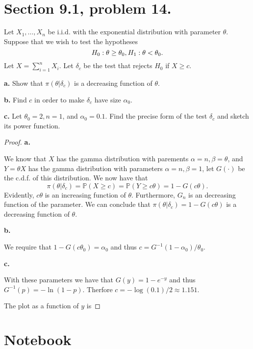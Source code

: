 \documentclass{article}
\renewcommand{\P}[1]{\mathbb{P}\left(#1\right)}
\newcommand{\randsamp}{X_1,\dots,X_n}
\newcommand{\cdf}{c.d.f. }
\newenvironment{hwproof}[1]
{
    #1
    \begin{proof}
}{
    \end{proof}
}
\begin{document}
\section{Section 9.1, problem 14.}
\begin{hwproof}
    {
        Let $\randsamp$ be i.i.d. with the exponential distribution with
        parameter $\theta$. Suppose that we wish to test the hypotheses
        \begin{equation*}
            H_0: \theta \geq \theta_0,\\
            H_1: \theta < \theta_0.
        \end{equation*}
        Let $X = \sum_{i = 1}^n X_i$. Let $\delta_c$ be the test that rejects
        $H_0$ if $X \geq c$.

        \textbf{a.} Show that $\pi(\theta | \delta_c)$ is a decreasing function of
        $\theta$.

        \textbf{b.} Find $c$ in order to make $\delta_c$ have size $\alpha_0$.

        \textbf{c.} Let $\theta_0 = 2, n = 1$, and $\alpha_0 = 0.1$. Find the
        precise form of the test $\delta_c$ and sketch its power function.

    }
    \textbf{a.}

    We know that $X$ has the gamma distribution with parements
    $\alpha = n, \beta = \theta$, and $Y = \theta X$ has the gamma distribution
    with parameters $\alpha = n, \beta = 1$, let $G(\cdot)$ be the \cdf of this
    distribution. We now have that
    \begin{equation*}
        \pi(\theta | \delta_c) = \P{X \geq c} = \P{Y \geq c\theta} = 1 - G(c\theta).
    \end{equation*}
    Evidently, $c\theta$ is an increasing function of $\theta$. Furthermore,
    $G_n$ is an decreasing function of the parameter. We can conclude that
    $\pi(\theta | \delta_c) = 1 - G(c\theta)$ is a decreasing function
    of $\theta$.

    \textbf{b.}

    We require that $1 - G(c\theta_0) = \alpha_0$ and thus
    $c = G^{-1}(1 - \alpha_0)/\theta_0$.

    \textbf{c.}

    With these parameters we have that $G(y) = 1 - e^{-y}$ and thus
    $G^{-1}(p) = -\ln(1 - p)$. Therfore
    $c = -\log(0.1)/2 \approx 1.151$.

    The plot as a function of $y$ is

\end{hwproof}
\section{Notebook}
\end{document}
